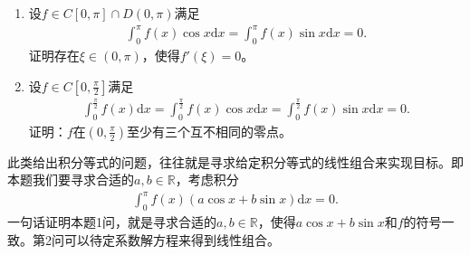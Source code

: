 \documentclass[../../main.tex]{subfiles}
\begin{document}
\begin{example}
\begin{enumerate}
\item 设$f\in C[0,\pi]\cap D(0,\pi)$满足
\begin{align*}
\int_0^\pi f(x)\cos x\mathrm{d}x = \int_0^\pi f(x)\sin x\mathrm{d}x = 0.
\end{align*}
证明存在$\xi\in(0,\pi)$，使得$f'(\xi)=0$。

\item 设$f\in C[0,\frac{\pi}{2}]$满足
\begin{align}\label{example0.12-11.64}
\int_0^{\frac{\pi}{2}} f(x)\mathrm{d}x = \int_0^{\frac{\pi}{2}} f(x)\cos x\mathrm{d}x = \int_0^{\frac{\pi}{2}} f(x)\sin x\mathrm{d}x = 0.
\end{align}
证明：$f$在$(0,\frac{\pi}{2})$至少有三个互不相同的零点。
\end{enumerate}
\end{example}
\begin{note}
此类给出积分等式的问题，往往就是寻求给定积分等式的线性组合来实现目标。即本题我们要寻求合适的$a,b\in\mathbb{R}$，考虑积分
\begin{align*}
\int_0^\pi f(x)(a\cos x + b\sin x)\mathrm{d}x = 0.
\end{align*}
一句话证明本题1问，就是寻求合适的$a,b\in\mathbb{R}$，使得$a\cos x + b\sin x$和$f$的符号一致。第2问可以待定系数解方程来得到线性组合。
\end{note}
\end{document}
